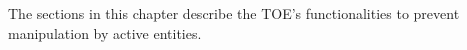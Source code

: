 
The sections in this chapter describe the TOE's functionalities to prevent
manipulation by active entities.


